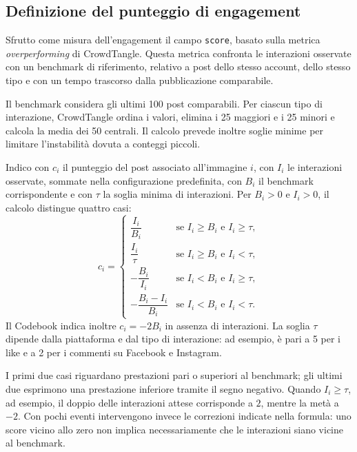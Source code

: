 \subsection{Definizione del punteggio di engagement}
\label{sec:dataset-engagement}

Sfrutto come misura dell'engagement il campo \texttt{score}, basato sulla metrica \emph{overperforming} di CrowdTangle. Questa metrica confronta le interazioni osservate con un benchmark di riferimento, relativo a post dello stesso account, dello stesso tipo e con un tempo trascorso dalla pubblicazione comparabile.

Il benchmark considera gli ultimi 100 post comparabili. Per ciascun tipo di interazione, CrowdTangle ordina i valori, elimina i 25 maggiori e i 25 minori e calcola la media dei 50 centrali. Il calcolo prevede inoltre soglie minime per limitare l'instabilità dovuta a conteggi piccoli.

Indico con $c_i$ il punteggio del post associato all'immagine $i$, con $I_i$ le interazioni osservate, sommate nella configurazione predefinita, con $B_i$ il benchmark corrispondente e con $\tau$ la soglia minima di interazioni. Per $B_i>0$ e $I_i>0$, il calcolo distingue quattro casi:
\begin{equation}
    c_i =
    \begin{cases}
        \dfrac{I_i}{B_i} & \text{se } I_i \geq B_i \text{ e } I_i \geq \tau, \\[6pt]
        \dfrac{I_i}{\tau} & \text{se } I_i \geq B_i \text{ e } I_i < \tau, \\[6pt]
        -\dfrac{B_i}{I_i} & \text{se } I_i < B_i \text{ e } I_i \geq \tau, \\[6pt]
        -\dfrac{B_i-I_i}{B_i} & \text{se } I_i < B_i \text{ e } I_i < \tau.
    \end{cases}
    \label{eq:dataset-overperforming}
\end{equation}
Il Codebook indica inoltre $c_i=-2B_i$ in assenza di interazioni. La soglia $\tau$ dipende dalla piattaforma e dal tipo di interazione: ad esempio, è pari a 5 per i like e a 2 per i commenti su Facebook e Instagram.

I primi due casi riguardano prestazioni pari o superiori al benchmark; gli ultimi due esprimono una prestazione inferiore tramite il segno negativo. Quando $I_i\geq\tau$, ad esempio, il doppio delle interazioni attese corrisponde a $2$, mentre la metà a $-2$. Con pochi eventi intervengono invece le correzioni indicate nella formula: uno score vicino allo zero non implica necessariamente che le interazioni siano vicine al benchmark.

